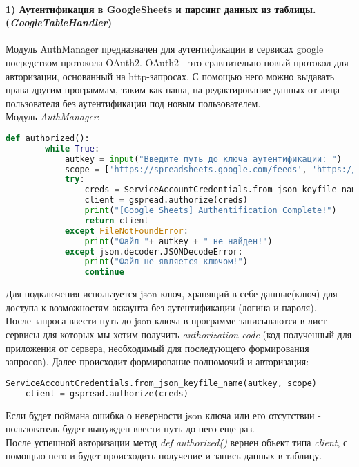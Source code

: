     \paragraph{1) Аутентификация в GoogleSheets и парсинг данных из таблицы.(\textit{GoogleTableHandler})\\
    }
    
    Модуль AuthManager предназначен для аутентификации в сервисах google посредством протокола OAuth2. OAuth2 - это сравнительно новый протокол для авторизации, основанный на http-запросах. С помощью него можно выдавать права другим программам, таким как наша, на редактирование данных от лица пользователя без аутентификации под новым пользователем.\\
    
    Модуль \textit{AuthManager}:
    \begin{lstlisting}[language=Python]
    def authorized():
        while True:
            autkey = input("Введите путь до ключа аутентификации: ")
            scope = ['https://spreadsheets.google.com/feeds', 'https://www.googleapis.com/auth/drive']
            try:
                creds = ServiceAccountCredentials.from_json_keyfile_name(autkey, scope)
                client = gspread.authorize(creds)
                print("[Google Sheets] Authentification Complete!")
                return client
            except FileNotFoundError:
                print("Файл "+ autkey + " не найден!")
            except json.decoder.JSONDecodeError:
                print("Файл не является ключом!")
                continue
    \end{lstlisting}
    
    Для подключения используется json-ключ, хранящий в себе данные(ключ) для доступа к возможностям аккаунта без аутентификации (логина и пароля).\\
    После запроса ввести путь до json-ключа в программе записываются в лист сервисы для которых мы хотим получить \textit{authorization code} (код полученный для приложения от сервера, необходимый для последующего формирования запросов).
    Далее происходит формирование полномочий и авторизация:
    
    \begin{lstlisting}[language=Python]
    ServiceAccountCredentials.from_json_keyfile_name(autkey, scope)
    client = gspread.authorize(creds)
    \end{lstlisting}
    
    Если будет поймана ошибка о неверности json ключа или его отсутствии - пользователь будет вынужден ввести путь до него еще раз.\\
    После успешной авторизации метод \textit{def authorized()} вернен обьект типа \textit{client}, с помощью него и будет происходить получение и запись данных в таблицу.\\
    
